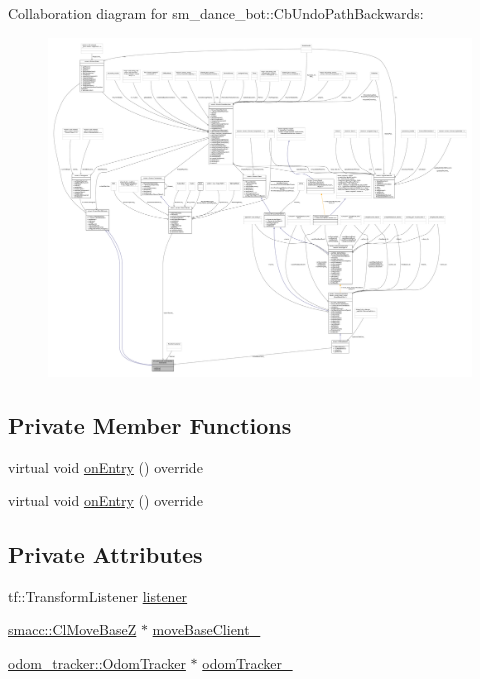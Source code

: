 Collaboration diagram for sm\+\_\+dance\+\_\+bot\+:\+:Cb\+Undo\+Path\+Backwards\+:
\nopagebreak
\begin{figure}[H]
\begin{center}
\leavevmode
\includegraphics[width=350pt]{classsm__dance__bot_1_1CbUndoPathBackwards__coll__graph}
\end{center}
\end{figure}
\subsection*{Private Member Functions}
\begin{DoxyCompactItemize}
\item 
virtual void \hyperlink{classsm__dance__bot_1_1CbUndoPathBackwards_a5ecdf83df96ab3d74eb4e4febea7fa74}{on\+Entry} () override
\item 
virtual void \hyperlink{classsm__dance__bot_1_1CbUndoPathBackwards_a5ecdf83df96ab3d74eb4e4febea7fa74}{on\+Entry} () override
\end{DoxyCompactItemize}
\subsection*{Private Attributes}
\begin{DoxyCompactItemize}
\item 
tf\+::\+Transform\+Listener \hyperlink{classsm__dance__bot_1_1CbUndoPathBackwards_a35aa53997f49c33d11a43cca81a72dfd}{listener}
\item 
\hyperlink{classsmacc_1_1ClMoveBaseZ}{smacc\+::\+Cl\+Move\+BaseZ} $\ast$ \hyperlink{classsm__dance__bot_1_1CbUndoPathBackwards_a2e134a879373ea9d29d04f72f707cbc8}{move\+Base\+Client\+\_\+}
\item 
\hyperlink{classodom__tracker_1_1OdomTracker}{odom\+\_\+tracker\+::\+Odom\+Tracker} $\ast$ \hyperlink{classsm__dance__bot_1_1CbUndoPathBackwards_a75335993a9cd613c7aba93ccb518c645}{odom\+Tracker\+\_\+}
\end{DoxyCompactItemize}
